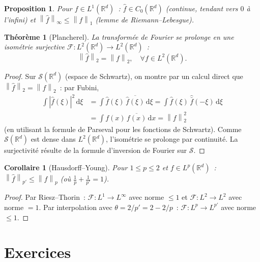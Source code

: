 \documentclass[a4paper,12pt]{book}
\newcommand{\R}{\mathbb{R}}
\newcommand{\dd}{\mathrm{d}}
\newcommand{\norm}[1]{\left\| #1 \right\|}
\newcommand{\abs}[1]{\left| #1 \right|}
\theoremstyle{definition}
\theoremstyle{plain}
\newtheorem{theoreme}[definition]{Théorème}
\newtheorem{proposition}[definition]{Proposition}
\newtheorem{corollaire}[definition]{Corollaire}
\theoremstyle{remark}
\begin{document}
\begin{proposition}
\label{prop:fourier-L1}
Pour $f \in L^1(\R^d)$~: $\hat f \in C_0(\R^d)$ (continue, tendant vers $0$ à l'infini)
et $\norm{\hat f}_\infty \le \norm{f}_1$ (lemme de Riemann--Lebesgue).
\end{proposition}

\begin{theoreme}[Plancherel]
\label{thm:plancherel}
La transformée de Fourier se prolonge en une isométrie surjective
$\mathcal{F} : L^2(\R^d) \to L^2(\R^d)$~:
\[
  \norm{\hat f}_2 = \norm{f}_2, \quad \forall f \in L^2(\R^d).
\]
\end{theoreme}

\begin{proof}
Sur $\mathcal{S}(\R^d)$ (espace de Schwartz), on montre par
un calcul direct que $\norm{\hat f}_2 = \norm{f}_2$~: par Fubini,
\begin{align*}
  \int \abs{\hat f(\xi)}^2\,\dd\xi
    &= \int \hat f(\xi)\,\overline{\hat f(\xi)}\,\dd\xi
    = \int \hat f(\xi)\,\widehat{\bar f}(-\xi)\,\dd\xi \\
    &= \int f(x)\,\overline{f(x)}\,\dd x = \norm{f}_2^2
\end{align*}
(en utilisant la formule de Parseval pour les fonctions de
Schwartz). Comme $\mathcal{S}(\R^d)$ est dense dans $L^2(\R^d)$, l'isométrie se prolonge
par continuité. La surjectivité résulte de la formule d'inversion de Fourier sur
$\mathcal{S}$.
\end{proof}

\begin{corollaire}[Hausdorff--Young]
\label{cor:hausdorff-young}
Pour $1 \le p \le 2$ et $f \in L^p(\R^d)$~:
$\norm{\hat f}_{p'} \le \norm{f}_p$ (où $\frac{1}{p} + \frac{1}{p'} = 1$).
\end{corollaire}

\begin{proof}
Par Riesz--Thorin~: $\mathcal{F} : L^1 \to L^\infty$ avec norme $\le 1$ et
$\mathcal{F} : L^2 \to L^2$ avec norme $= 1$. Par interpolation avec
$\theta = 2/p' = 2 - 2/p$~: $\mathcal{F} : L^p \to L^{p'}$ avec norme $\le 1$.
\end{proof}

\section{Exercices}
\end{document}
